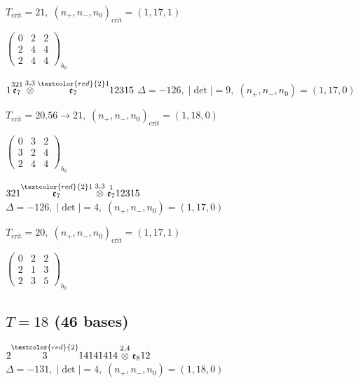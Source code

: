 \documentclass[10pt]{article}
\begin{document}
\hspace{1em}$T_{\text{crit}}=21,\; (n_+,n_-,n_0)_{\text{crit}}=(1,17,1)$

\hspace{2em}$\left(\begin{smallmatrix}0 & 2 & 2 \\ 2 & 4 & 4 \\ 2 & 4 & 4\end{smallmatrix}\right)_{\!b_0}$

\smallskip

$1\overset{321}{\mathfrak{e}_7}\overset{3,3}{\otimes}\overset{\textcolor{red}{2}1}{\mathfrak{e}_7}12315$ \quad $\Delta=-126,\; |\det|=9,\; (n_+,n_-,n_0)=(1,17,0)$

\hspace{1em}$T_{\text{crit}}=20.56 \to 21,\; (n_+,n_-,n_0)_{\text{crit}}=(1,18,0)$

\hspace{2em}$\left(\begin{smallmatrix}0 & 3 & 2 \\ 3 & 2 & 4 \\ 2 & 4 & 4\end{smallmatrix}\right)_{\!b_0}$

$321\overset{\textcolor{red}{2}1}{\mathfrak{e}_7}\overset{3,3}{\otimes}\overset{1}{\mathfrak{e}_7}12315$ \quad $\Delta=-126,\; |\det|=4,\; (n_+,n_-,n_0)=(1,17,0)$

\hspace{1em}$T_{\text{crit}}=20,\; (n_+,n_-,n_0)_{\text{crit}}=(1,17,1)$

\hspace{2em}$\left(\begin{smallmatrix}0 & 2 & 2 \\ 2 & 1 & 3 \\ 2 & 3 & 5\end{smallmatrix}\right)_{\!b_0}$


\subsection*{$T = 18$ \quad (46 bases)}
\smallskip

$2\overset{\textcolor{red}{2}}{3}14141414\overset{2,4}{\otimes}\mathfrak{e}_812$ \quad $\Delta=-131,\; |\det|=4,\; (n_+,n_-,n_0)=(1,18,0)$
\end{document}
